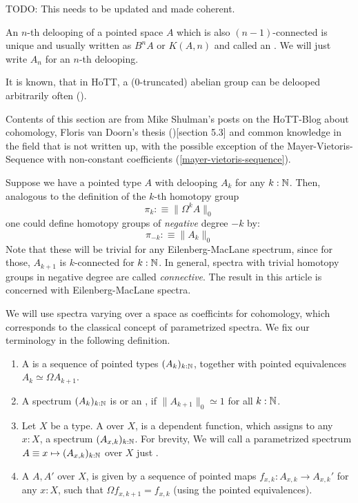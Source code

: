 
TODO: This needs to be updated and made coherent.

An $n$-th delooping of a pointed space $A$ which is also $(n-1)$-connected is unique and usually written as $B^nA$ or $K(A,n)$ and called an .
We will just write $A_n$ for an $n$-th delooping.

It is known, that in HoTT, a (0-truncated) abelian group can be delooped arbitrarily often (\cite{LicataFinster}).

Contents of this section are from Mike Shulman's posts on the HoTT-Blog about cohomology,
Floris van Doorn's thesis (\cite{floris-thesis})[section 5.3]
and common knowledge in the field that is not written up,
with the possible exception of the Mayer-Vietoris-Sequence with non-constant coefficients (\cref{mayer-vietoris-sequence}).

Suppose we have a pointed type $A$ with delooping $A_k$ for any $k:\mathbb{N}$.
Then, analogous to the definition of the $k$-th homotopy group
\[ \pi_k:\equiv\|\Omega^kA \|_0 \]
one could define homotopy groups of \emph{negative} degree $-k$ by:
\[ \pi_{-k}:\equiv\|A_k \|_0 \]
Note that these will be trivial for any Eilenberg-MacLane spectrum, since for those, $A_{k+1}$ is $k$-connected for $k:\mathbb{N}$.
In general, spectra with trivial homotopy groups in negative degree are called \emph{connective}.
The result in this article is concerned with Eilenberg-MacLane spectra.

We will use spectra varying over a space as coefficints for cohomology,
which corresponds to the classical concept of parametrized spectra.
We fix our terminology in the following definition.

\begin{definition}
  \begin{enumerate}
  \item A  is a sequence of pointed types $(A_k)_{k:\mathbb{N}}$, together with pointed equivalences $A_k\simeq \Omega A_{k+1}$.
  \item A spectrum $(A_k)_{k:\mathbb{N}}$ is  or an , if $\|A_{k+1}\|_0\simeq 1$ for all $k:\mathbb{N}$.
  \item Let $X$ be a type. A  over $X$, is a dependent function, which assigns to any $x:X$, a spectrum $(A_{x,k})_{k:\mathbb{N}}$.
    For brevity, We will call a parametrized spectrum $A\equiv x\mapsto (A_{x,k})_{k:\mathbb{N}}$ over $X$ just .
  \item A  $A,A'$ over $X$, is given by a sequence of pointed maps $f_{x,k}:A_{x,k}\to A_{x,k}'$ for any $x:X$,
    such that $\Omega f_{x,k+1}=f_{x,k}$ (using the pointed equivalences).
  \end{enumerate}
\end{definition}

